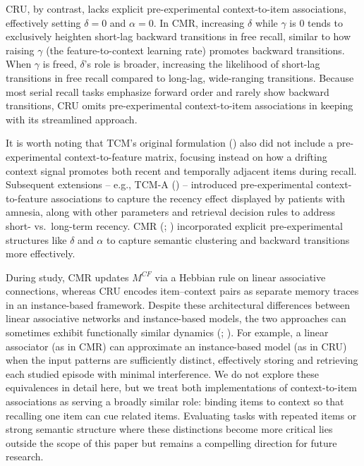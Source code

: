 \documentclass[
  man,
  floatsintext,
  longtable,
  nolmodern,
  notxfonts,
  notimes,
  draftfirst,
  colorlinks=true,linkcolor=blue,citecolor=blue,urlcolor=blue]{apa7}
\begin{document}
CRU, by contrast, lacks explicit pre-experimental context-to-item
associations, effectively setting \(\delta = 0\) and \(\alpha = 0\). In
CMR, increasing \(\delta\) while \(\gamma\) is 0 tends to exclusively
heighten short-lag backward transitions in free recall, similar to how
raising \(\gamma\) (the feature-to-context learning rate) promotes
backward transitions. When \(\gamma\) is freed, \(\delta\)'s role is
broader, increasing the likelihood of short-lag transitions in free
recall compared to long-lag, wide-ranging transitions. Because most
serial recall tasks emphasize forward order and rarely show backward
transitions, CRU omits pre-experimental context-to-item associations in
keeping with its streamlined approach.

It is worth noting that TCM's original formulation
() also did
not include a pre-experimental context-to-feature matrix, focusing
instead on how a drifting context signal promotes both recent and
temporally adjacent items during recall. Subsequent extensions -- e.g.,
TCM-A () --
introduced pre-experimental context-to-feature associations to capture
the recency effect displayed by patients with amnesia, along with other
parameters and retrieval decision rules to address short- vs.~long-term
recency. CMR (; ) incorporated
explicit pre-experimental structures like \(\delta\) and \(\alpha\) to
capture semantic clustering and backward transitions more effectively.

During study, CMR updates \(M^{CF}\) via a Hebbian rule on linear
associative connections, whereas CRU encodes item--context pairs as
separate memory traces in an instance-based framework. Despite these
architectural differences between linear associative networks and
instance-based models, the two approaches can sometimes exhibit
functionally similar dynamics (; ). For example, a linear associator (as in CMR) can approximate an
instance-based model (as in CRU) when the input patterns are
sufficiently distinct, effectively storing and retrieving each studied
episode with minimal interference. We do not explore these equivalences
in detail here, but we treat both implementations of context-to-item
associations as serving a broadly similar role: binding items to context
so that recalling one item can cue related items. Evaluating tasks with
repeated items or strong semantic structure where these distinctions
become more critical lies outside the scope of this paper but remains a
compelling direction for future research.
\end{document}
